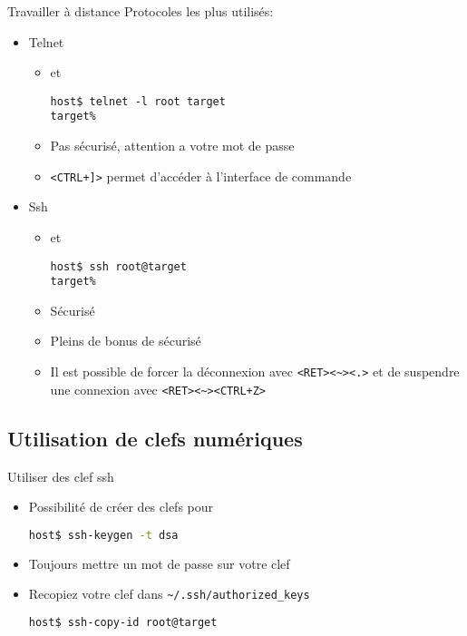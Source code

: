 \begin{frame}[fragile=singleslide]{Travailler à distance}
  Protocoles les plus utilisés:
  \begin{itemize}
  \item Telnet
    \begin{itemize}
    \item {} et 
      \begin{lstlisting}
host$ telnet -l root target
target%
      \end{lstlisting} %
    \item   Pas   sécurisé,   attention   a   votre   mot   de   passe
    \item \verb/<CTRL+]>/ permet d'accéder à l'interface de commande
    \end{itemize}
  \item Ssh
    \begin{itemize}
    \item {} et 
      \begin{lstlisting}
host$ ssh root@target
target%
      \end{lstlisting} %
    \item Sécurisé
    \item Pleins de bonus de sécurisé
    \item   Il   est   possible   de  forcer   la   déconnexion   avec
      \verb/<RET><~><.>/   et   de   suspendre  une   connexion   avec
      \verb/<RET><~><CTRL+Z>/
    \end{itemize}
  \end{itemize}
\end{frame}

\subsection{Utilisation de clefs numériques}

\begin{frame}[fragile=singleslide]{Utiliser des clef ssh}
  \begin{itemize}
  \item Possibilité de créer des clefs pour 
    \begin{lstlisting}[language=sh]
host$ ssh-keygen -t dsa
    \end{lstlisting} %
  \item Toujours mettre un mot de passe sur votre clef
  \item Recopiez votre clef dans \verb+~/.ssh/authorized_keys+
    \begin{lstlisting}[language=sh]
host$ ssh-copy-id root@target
    \end{lstlisting} %
  \end{itemize}
\end{frame}

